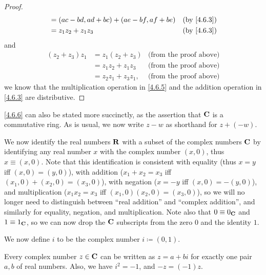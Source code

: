 \begin{proof}
\begin{align*}
                    & = (ac - bd, ad + bc) + (ae - bf, af + be)                 & \text{(by \cref{4.6.3})}  \\
                    & = z_1 z_2 + z_1 z_3                                       & \text{(by \cref{4.6.3})}
  \end{align*}
  and
  \begin{align*}
    (z_2 + z_3) z_1 & = z_1 (z_2 + z_3)    & \text{(from the proof above)} \\
                    & = z_1 z_2 + z_1 z_3  & \text{(from the proof above)} \\
                    & = z_2 z_1 + z_3 z_1, & \text{(from the proof above)}
  \end{align*}
  we know that the multiplication operation in \cref{4.6.5} and the addition operation in \cref{4.6.3} are distributive.
\end{proof}

\begin{note}
  \cref{4.6.6} can also be stated more succinctly, as the assertion that \(\mathbf{C}\) is a commutative ring.
  As is usual, we now write \(z - w\) as shorthand for \(z + (-w)\).
\end{note}

\begin{note}
  We now identify the real numbers \(\mathbf{R}\) with a subset of the complex numbers \(\mathbf{C}\) by identifying any real number \(x\) with the complex number \((x, 0)\), thus \(x \equiv (x, 0)\).
  Note that this identification is consistent with equality (thus \(x = y\) iff \((x, 0) = (y, 0)\)), with addition (\(x_1 + x_2 = x_3\) iff \((x_1, 0) + (x_2, 0) = (x_3, 0)\)), with negation (\(x = -y\) iff \((x, 0) = -(y, 0)\)), and multiplication (\(x_1 x_2 = x_3\) iff \((x_1, 0) (x_2, 0) = (x_3, 0)\)), so we will no longer need to distinguish between ``real addition'' and ``complex addition'', and similarly for equality, negation, and multiplication.
  Note also that \(0 \equiv 0_{\mathbf{C}}\) and \(1 \equiv 1_{\mathbf{C}}\), so we can now drop the \(\mathbf{C}\) subscripts from the zero \(0\) and the identity \(1\).
\end{note}

\begin{note}
  We now define \(i\) to be the complex number \(i \coloneqq (0, 1)\).
\end{note}

\begin{lemma}\label{4.6.7}
  Every complex number \(z \in \mathbf{C}\) can be written as \(z = a + bi\) for exactly one pair \(a, b\) of real numbers.
  Also, we have \(i^2 = -1\), and \(-z = (-1)z\).
\end{lemma}

